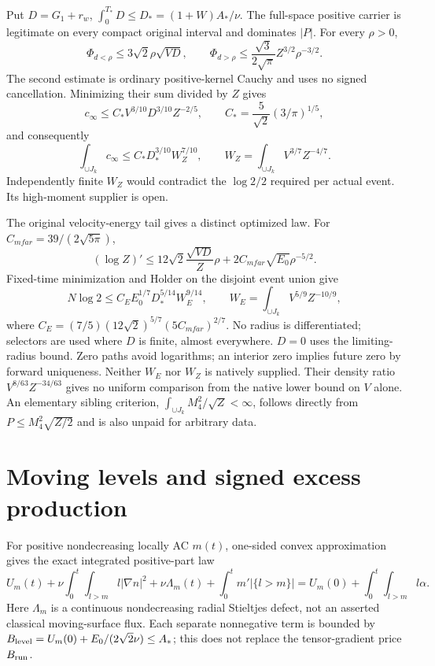\documentclass[11pt]{article}
\begin{document}
Put $D=G_1+r_w$, $\int_0^{T_*}D\le D_*=(1+W)A_*/\nu$.
The full-space positive carrier is legitimate on every compact original
interval and dominates $|P|$. For every $\rho>0$,
\[
 \Phi_{d<\rho}\le3\sqrt2\rho\sqrt{VD},\qquad
 \Phi_{d>\rho}\le\frac{\sqrt3}{2\sqrt\pi}Z^{3/2}\rho^{-3/2}.
\]
The second estimate is ordinary positive-kernel Cauchy and uses no signed
cancellation. Minimizing their sum divided by $Z$ gives
\[
 c_\infty\le C_*V^{3/10}D^{3/10}Z^{-2/5},\qquad
 C_*=\frac5{\sqrt2}(3/\pi)^{1/5},
\]
and consequently
\[
 \int_{\cup J_k}c_\infty\le C_*D_*^{3/10}W_Z^{7/10},\qquad
 W_Z=\int_{\cup J_k}V^{3/7}Z^{-4/7}.
\]
Independently finite $W_Z$ would contradict the $\log2/2$ required
per actual event. Its high-moment supplier is open.

The original velocity-energy tail gives a distinct optimized law.
For $C_{
m far}=39/(2\sqrt{5\pi})$,
\[
 (\log Z)'\le12\sqrt2\frac{\sqrt{VD}}Z\rho
                      +2C_{
m far}\sqrt{E_0}\rho^{-5/2}.
\]
Fixed-time minimization and Holder on the disjoint event union give
\[
 N\log2\le C_EE_0^{1/7}D_*^{5/14}W_E^{9/14},\qquad
 W_E=\int_{\cup J_k}V^{5/9}Z^{-10/9},
\]
where $C_E=(7/5)(12\sqrt2)^{5/7}(5C_{
m far})^{2/7}$.
No radius is differentiated; selectors are used where $D$ is finite,
almost everywhere. $D=0$ uses the limiting-radius bound. Zero paths
avoid logarithms; an interior zero implies future zero by forward
uniqueness. Neither $W_E$ nor $W_Z$ is natively supplied. Their density
ratio $V^{8/63}Z^{-34/63}$ gives no uniform comparison from the native
lower bound on $V$ alone. An elementary sibling criterion,
$\int_{\cup J_k}M_4^2/\sqrt Z<\infty$, follows directly from
$P\le M_4^2\sqrt{Z/2}$ and is also unpaid for arbitrary data.

\section{Moving levels and signed excess production}
For positive nondecreasing locally AC $m(t)$, one-sided convex
approximation gives the exact integrated positive-part law
\[
 U_m(t)+\nu\int_0^t\!\int_{l>m}l|\nabla n|^2+\nu\Lambda_m(t)
       +\int_0^tm'|\{l>m\}|
 =U_m(0)+\int_0^t\!\int_{l>m}l\alpha.
\]
Here $\Lambda_m$ is a continuous nondecreasing radial Stieltjes defect,
not an asserted classical moving-surface flux. Each separate nonnegative
term is bounded by $B_{\rm level}=U_m(0)+E_0/(2\sqrt2\nu)\le A_*$;
this does not replace the tensor-gradient price $B_{\rm run}$.
\end{document}
